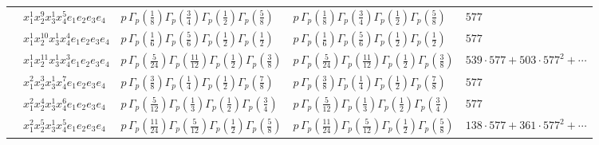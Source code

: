 \documentclass[11pt]{article}
\begin{document}
\begin{table}[ht]
{\begin{tabular}{@{}lllll@{}}
 & $x_{1}^{1} x_{2}^{9} x_{3}^{1} x_{4}^{5}  e_{1} e_{2} e_{3} e_{4}$ & $p \, \Gamma_p \left( \frac{1}{8} \right) \Gamma_p \left( \frac{3}{4} \right) \Gamma_p \left( \frac{1}{2} \right) \Gamma_p \left( \frac{5}{8} \right)$ & $p \, \Gamma_p \left( \frac{1}{8} \right) \Gamma_p \left( \frac{3}{4} \right) \Gamma_p \left( \frac{1}{2} \right) \Gamma_p \left( \frac{5}{8} \right)$ & $577$ \\
 & $x_{1}^{1} x_{2}^{10} x_{3}^{1} x_{4}^{4}  e_{1} e_{2} e_{3} e_{4}$ & $p \, \Gamma_p \left( \frac{1}{6} \right) \Gamma_p \left( \frac{5}{6} \right) \Gamma_p \left( \frac{1}{2} \right) \Gamma_p \left( \frac{1}{2} \right)$ & $p \, \Gamma_p \left( \frac{1}{6} \right) \Gamma_p \left( \frac{5}{6} \right) \Gamma_p \left( \frac{1}{2} \right) \Gamma_p \left( \frac{1}{2} \right)$ & $577$ \\
 & $x_{1}^{1} x_{2}^{11} x_{3}^{1} x_{4}^{3}  e_{1} e_{2} e_{3} e_{4}$ & $p \, \Gamma_p \left( \frac{5}{24} \right) \Gamma_p \left( \frac{11}{12} \right) \Gamma_p \left( \frac{1}{2} \right) \Gamma_p \left( \frac{3}{8} \right)$ & $p \, \Gamma_p \left( \frac{5}{24} \right) \Gamma_p \left( \frac{11}{12} \right) \Gamma_p \left( \frac{1}{2} \right) \Gamma_p \left( \frac{3}{8} \right)$ & $539{\cdot}577{+}503{\cdot}577^{2}{+}\cdots$ \\
 & $x_{1}^{2} x_{2}^{3} x_{3}^{1} x_{4}^{7}  e_{1} e_{2} e_{3} e_{4}$ & $p \, \Gamma_p \left( \frac{3}{8} \right) \Gamma_p \left( \frac{1}{4} \right) \Gamma_p \left( \frac{1}{2} \right) \Gamma_p \left( \frac{7}{8} \right)$ & $p \, \Gamma_p \left( \frac{3}{8} \right) \Gamma_p \left( \frac{1}{4} \right) \Gamma_p \left( \frac{1}{2} \right) \Gamma_p \left( \frac{7}{8} \right)$ & $577$ \\
 & $x_{1}^{2} x_{2}^{4} x_{3}^{1} x_{4}^{6}  e_{1} e_{2} e_{3} e_{4}$ & $p \, \Gamma_p \left( \frac{5}{12} \right) \Gamma_p \left( \frac{1}{3} \right) \Gamma_p \left( \frac{1}{2} \right) \Gamma_p \left( \frac{3}{4} \right)$ & $p \, \Gamma_p \left( \frac{5}{12} \right) \Gamma_p \left( \frac{1}{3} \right) \Gamma_p \left( \frac{1}{2} \right) \Gamma_p \left( \frac{3}{4} \right)$ & $577$ \\
 & $x_{1}^{2} x_{2}^{5} x_{3}^{1} x_{4}^{5}  e_{1} e_{2} e_{3} e_{4}$ & $p \, \Gamma_p \left( \frac{11}{24} \right) \Gamma_p \left( \frac{5}{12} \right) \Gamma_p \left( \frac{1}{2} \right) \Gamma_p \left( \frac{5}{8} \right)$ & $p \, \Gamma_p \left( \frac{11}{24} \right) \Gamma_p \left( \frac{5}{12} \right) \Gamma_p \left( \frac{1}{2} \right) \Gamma_p \left( \frac{5}{8} \right)$ & $138{\cdot}577{+}361{\cdot}577^{2}{+}\cdots$ \\

\end{tabular}}
\end{table}
\end{document}
